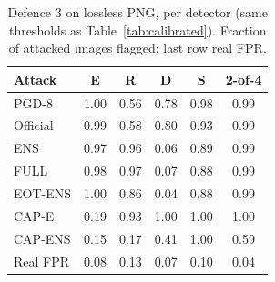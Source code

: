 \begin{table}[!t]
\caption{Defence 3 on lossless PNG, per detector (same thresholds as Table~\ref{tab:calibrated}). Fraction of attacked images flagged; last row real FPR.}
\label{tab:calibrated_det}
\centering
\begin{tabular}{l cccc c}
\toprule
Attack & E & R & D & S & 2-of-4 \\
\midrule
PGD-8 & 1.00 & 0.56 & 0.78 & 0.98 & 0.99 \\
Official & 0.99 & 0.58 & 0.80 & 0.93 & 0.99 \\
ENS & 0.97 & 0.96 & 0.06 & 0.89 & 0.99 \\
FULL & 0.98 & 0.97 & 0.07 & 0.88 & 0.99 \\
EOT-ENS & 1.00 & 0.86 & 0.04 & 0.88 & 0.99 \\
CAP-E & 0.19 & 0.93 & 1.00 & 1.00 & 1.00 \\
CAP-ENS & 0.15 & 0.17 & 0.41 & 1.00 & 0.59 \\
\midrule
Real FPR & 0.08 & 0.13 & 0.07 & 0.10 & 0.04 \\
\bottomrule
\end{tabular}
\end{table}

